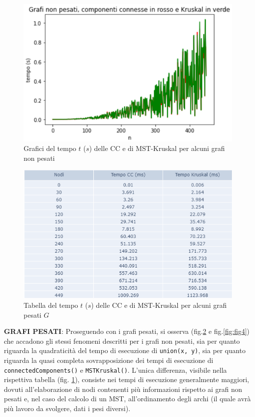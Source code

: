 \documentclass[]{article}
\def\code#1{\texttt{#1}} %
\begin{document}
\begin{figure}[H]
\centering
\includegraphics[width=.7\textwidth, height=.6\textheight, keepaspectratio]{GraficoGrafiNonPesatiCCeK}
\caption{Grafici del tempo $t$ ($s$) delle CC e di MST-Kruskal per alcuni grafi non pesati}
\label{fig:fig2}
\end{figure}



\begin{figure}[!h]
\centering
\includegraphics[width=\textwidth]{tabella_GrafiPesati}
\vspace{-5mm}
\caption{Tabella del tempo $t$ ($s$) delle CC e di MST-Kruskal per alcuni grafi pesati $G$}
\label{fig:fig3}
\end{figure}

{\bf GRAFI PESATI}: Proseguendo con i grafi pesati, si osserva (fig.\ref{fig:fig3} e fig.\ref{fig:fig4}) che accadono gli stessi fenomeni descritti per i grafi non pesati, sia per quanto riguarda la quadraticità del tempo di esecuzione di \code{union(x, y)}, sia per quanto riguarda la quasi completa sovrapposizione dei tempi di esecuzione di \code{connectedComponents()} e \code{MSTKruskal()}. L'unica differenza, visibile nella rispettiva tabella  (fig. \ref{fig:fig2}), consiste nei tempi di esecuzione generalmente maggiori, dovuti all'elaborazione di nodi contenenti più informazioni rispetto ai grafi non pesati e, nel caso del calcolo di un MST, all'ordinamento degli archi (il quale avrà più lavoro da svolgere, dati i pesi diversi).
\end{document}
